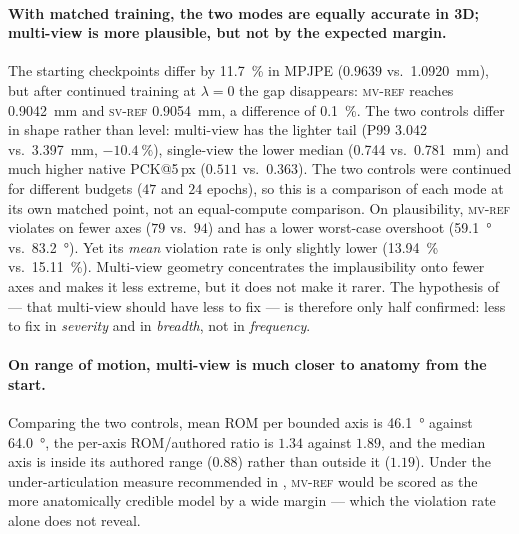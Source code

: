 \documentclass[11pt,a4paper]{article}
\newcommand{\lam}{\lambda}
\newcommand{\armref}{\textsc{mv-ref}}
\newcommand{\svref}{\textsc{sv-ref}}
\begin{document}
\paragraph{With matched training, the two modes are equally accurate in 3D;
multi-view is more plausible, but not by the expected margin.}
The starting checkpoints differ by \SI{11.7}{\percent} in MPJPE ($0.9639$ vs.\
\SI{1.0920}{\milli\metre}), but after continued training at $\lam = 0$ the gap
disappears: \armref{} reaches \SI{0.9042}{\milli\metre} and \svref{}
\SI{0.9054}{\milli\metre}, a difference of \SI{0.1}{\percent}. The two
controls differ in shape rather than level: multi-view has the lighter tail
(P99 \SI{3.042}{} vs.\ \SI{3.397}{\milli\metre}, $-\SI{10.4}{\percent}$),
single-view the lower median (\SI{0.744}{} vs.\ \SI{0.781}{\milli\metre}) and
much higher native PCK@5\,px ($0.511$ vs.\ $0.363$). The two controls were
continued for different budgets ($47$ and $24$ epochs), so this is a comparison
of each mode at its own matched point, not an equal-compute comparison. On
plausibility, \armref{} violates on fewer axes ($79$ vs.\ $94$) and has a
lower worst-case overshoot (\SI{59.1}{\degree} vs.\ \SI{83.2}{\degree}). Yet
its \emph{mean} violation rate is only slightly lower (\SI{13.94}{\percent}
vs.\ \SI{15.11}{\percent}). Multi-view geometry concentrates the implausibility onto
fewer axes and makes it less extreme, but it does not make it rarer. The
hypothesis of \cite{sv} --- that multi-view should have less to fix --- is
therefore only half confirmed: less to fix in \emph{severity} and in
\emph{breadth}, not in \emph{frequency}.

\paragraph{On range of motion, multi-view is much closer to anatomy from the
start.}
Comparing the two controls, mean ROM per bounded axis is \SI{46.1}{\degree}
against \SI{64.0}{\degree}, the per-axis ROM/authored ratio is $1.34$ against
$1.89$, and the median axis is inside its authored range ($0.88$) rather than
outside it ($1.19$). Under the under-articulation measure recommended in
\cite{sv}, \armref{} would be scored as the more anatomically credible model by a wide margin ---
which the violation rate alone does not reveal.
\end{document}
